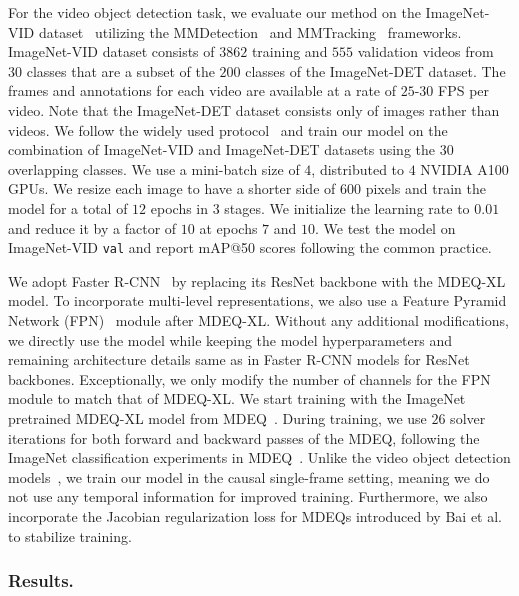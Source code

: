 \documentclass[runningheads]{llncs}
\begin{document}
For the video object detection task, we evaluate our method on the ImageNet-VID dataset~\cite{imagenetviddataset} utilizing the MMDetection~\cite{mmdetection} and MMTracking~\cite{mmtracking} frameworks. ImageNet-VID dataset consists of $3862$ training and $555$ validation videos from $30$ classes that are a subset of the $200$ classes of the ImageNet-DET dataset. The frames and annotations for each video are available at a rate of $25$-$30$ FPS per video. Note that the ImageNet-DET dataset consists only of images rather than videos. We follow the widely used protocol~\cite{zhu2017fgfa,wang2018manet,deng2019relation,wu2019selsa,chen2020mega} and train our model on the combination of ImageNet-VID and ImageNet-DET datasets using the $30$ overlapping classes. We use a mini-batch size of $4$, distributed to $4$ NVIDIA A100 GPUs. We resize each image to have a shorter side of $600$ pixels and train the model for a total of $12$ epochs in $3$ stages. We initialize the learning rate to $0.01$ and reduce it by a factor of $10$ at epochs $7$ and $10$. We test the model on ImageNet-VID \texttt{val} and report mAP@50 scores following the common practice.


We adopt Faster R-CNN~\cite{ren2015faster} by replacing its ResNet backbone with the MDEQ-XL model. To incorporate multi-level representations, we also use a Feature Pyramid Network (FPN)~\cite{lin2017feature} module after MDEQ-XL. Without any additional modifications, we directly use the model while keeping the model hyperparameters and remaining architecture details same  as in Faster R-CNN models for ResNet backbones. Exceptionally, we only modify the number of channels for the FPN module to match that of MDEQ-XL. We start training with the ImageNet pretrained MDEQ-XL model from MDEQ~\cite{bai2020mdeq}. During training, we use $26$ solver iterations for both forward and backward passes of the MDEQ, following the ImageNet classification experiments in MDEQ~\cite{bai2020mdeq}. Unlike the video object detection models~\cite{zhu2017fgfa,deng2019relation,chen2020mega}, we train our model in the causal single-frame setting, meaning we do not use any temporal information for improved training. Furthermore, we also incorporate the Jacobian regularization loss for MDEQs introduced by Bai et al.~\cite{bai2021stabilizing} to stabilize training.


\subsubsection{Results.}
\end{document}
